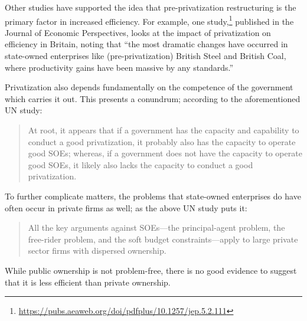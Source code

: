 Other studies have supported the idea that pre-privatization restructuring is the primary factor in increased efficiency.
For example, one study,\footnote{\href{https://pubs.aeaweb.org/doi/pdfplus/10.1257/jep.5.2.111}{https://pubs.aeaweb.org/doi/pdfplus/10.1257/jep.5.2.111}} published in the Journal of Economic Perspectives, looks at the impact of privatization on efficiency in Britain, noting that ``the most dramatic changes have occurred in state-owned enterprises like (pre-privatization) British Steel and British Coal, where productivity gains have been massive by any standards.''

Privatization also depends fundamentally on the competence of the government which carries it out.
This presents a conundrum; according to the aforementioned UN study:
\begin{quote}
At root, it appears that if a government has the capacity and capability to conduct a good privatization, it probably also has the capacity to operate good SOEs; whereas, if a government does not have the capacity to operate good SOEs, it likely also lacks the capacity to conduct a good privatization.
\end{quote}
To further complicate matters, the problems that state-owned enterprises do have often occur in private firms as well; as the above UN study puts it:
\begin{quote}
All the key arguments against SOEs---the principal-agent problem, the free-rider problem, and the soft budget constraints---apply to large private sector firms with dispersed ownership.
\end{quote}
While public ownership is not problem-free, there is no good evidence to suggest that it is less efficient than private ownership.
%
%
%
%
